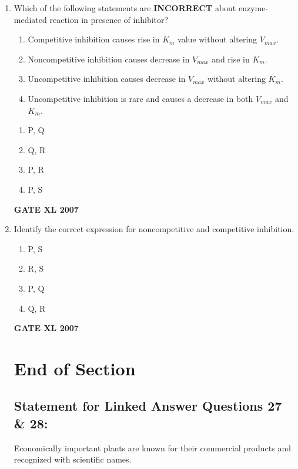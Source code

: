 \documentclass[journal,12pt,onecolumn]{IEEEtran}
\begin{document}
\begin{enumerate}
\item Which of the following statements are \textbf{INCORRECT} about enzyme-mediated reaction in presence of inhibitor?
\begin{enumerate}
    \item Competitive inhibition causes rise in $K_m$ value without altering $V_{max}$.
    \item Noncompetitive inhibition causes decrease in $V_{max}$ and rise in $K_m$.
    \item Uncompetitive inhibition causes decrease in $V_{max}$ without altering $K_m$.
    \item Uncompetitive inhibition is rare and causes a decrease in both $V_{max}$ and $K_m$.
\end{enumerate}
\begin{enumerate}
    \item P, Q
    \item Q, R
    \item P, R
    \item P, S
\end{enumerate}\hfill{\textbf{GATE XL 2007}}

\item Identify the correct expression for noncompetitive and competitive inhibition.

\begin{table}[H]
	
	\caption*{}
	\label{26}
\end{table}
\vspace{1em}

	\begin{enumerate}
    \item P, S
    \item R, S
    \item P, Q
    \item Q, R
\end{enumerate}\hfill{\textbf{GATE XL 2007}}

\vspace{2em}

\section*{End of Section}
\subsection*{Statement for Linked Answer Questions 27 \& 28:}
Economically important plants are known for their commercial products and recognized with scientific names.


\end{enumerate}
\end{document}
